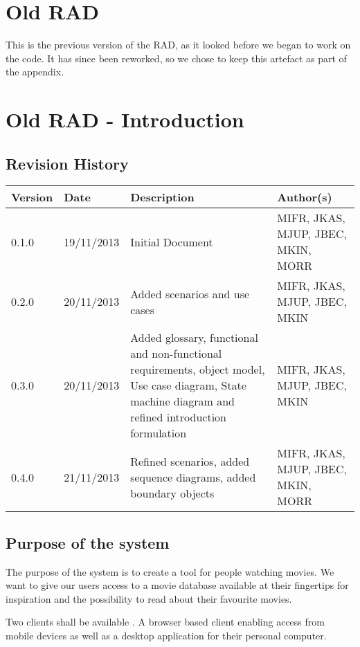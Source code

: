 \section{Old RAD}
This is the previous version of the RAD, as it looked before we began to work on the code. It has since been reworked, so we chose to keep this artefact as part of the appendix.

\section{Old RAD - Introduction}
\label{sec:introduction}

\subsection{Revision History}
\begin{center}
    \begin{tabular}{ | l | l | p{6cm} | p{4cm} |}
    \hline
    Version & Date & Description & Author(s) \\ \hline
    0.1.0 & 19/11/2013 & Initial Document & MIFR, JKAS, MJUP, JBEC, MKIN, MORR
    \\ \hline
    0.2.0 & 20/11/2013 & Added scenarios and use cases & MIFR, JKAS, MJUP, JBEC, MKIN
    \\ \hline
    0.3.0 & 20/11/2013 & Added glossary, functional and non-functional requirements, object model, Use case diagram, State machine diagram and refined introduction formulation & MIFR, JKAS, MJUP, JBEC, MKIN
    \\ \hline
    0.4.0 & 21/11/2013 & Refined scenarios, added sequence diagrams, added boundary objects & MIFR, JKAS, MJUP, JBEC, MKIN, MORR
    \\ \hline
    \end{tabular}
\end{center}

\subsection{Purpose of the system}

The purpose of the system is to create a tool for people watching movies. We want to give our users access to a movie database available at their fingertips for inspiration and the possibility to read about their favourite movies.

Two clients shall be available . A browser based client enabling access from mobile devices as well as a desktop application for their personal computer.  



